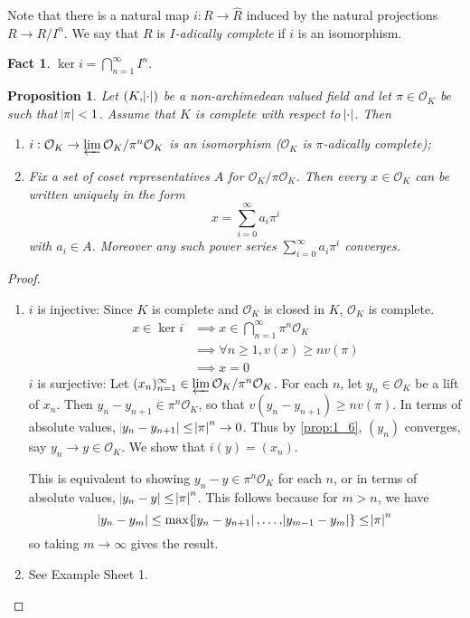 \documentclass[11pt]{article}
\theoremstyle{definition}
\newtheorem*{fact}{Fact}
\theoremstyle{plain}
\newtheorem{proposition}[definition]{Proposition}
\theoremstyle{remark}
\newcommand{\cO}{\mathcal{O}}
\begin{document}
Note that there is a natural map $i : R \to \widehat{R}$ induced by the natural projections $R \to R/I^n$. We say that $R$ is \emph{$I$-adically complete} if $i$ is an isomorphism.

\begin{fact}
    $\ker{i} = \bigcap_{n=1}^\infty I^n$.
\end{fact}

\begin{proposition}\label{prop:3_5}
    Let $(K, \abs{\cdot})$ be a non-archimedean valued field and let $\pi \in \cO_K$ be such that $\abs{\pi} < 1$. Assume that $K$ is complete with respect to $\abs{\cdot}$. Then
    \begin{enumerate}
        \item $i : \cO_K \to \varprojlim \cO_K / \pi^n \cO_K$ is an isomorphism ($\cO_K$ is $\pi$-adically complete);
        \item Fix a set of coset representatives $A$ for $\cO_K / \pi \cO_K$. Then every $x \in \cO_K$ can be written uniquely in the form
            \begin{equation*}
                x = \sum_{i=0}^\infty a_i \pi^i
            \end{equation*}
            with $a_i \in A$.
            Moreover any such power series $\sum_{i=0}^\infty a_i \pi^i$ converges.
    \end{enumerate}
\end{proposition}
\begin{proof}\phantom{}
    \begin{enumerate}
        \item $i$ is injective: Since $K$ is complete and $\cO_K$ is closed in $K$, $\cO_K$ is complete.
            \begin{align*}
                x \in \ker i
                &\implies x \in \bigcap_{n=1}^\infty \pi^n \cO_K\\
                &\implies \forall n \ge 1, v(x) \ge n v(\pi)\\
                &\implies x = 0
            \end{align*}
            $i$ is surjective: Let $(x_n)_{n=1}^\infty \in \varprojlim \cO_K / \pi^n \cO_K$. For each $n$, let $y_n \in \cO_K$ be a lift of $x_n$. Then $y_n - y_{n+1} \in \pi^n \cO_K$, so that $v(y_n - y_{n+1}) \ge n v(\pi)$. In terms of absolute values, $\abs{y_n - y_{n+1}} \le \abs{\pi}^n \to 0$. Thus by \autoref{prop:1_6}, $(y_n)$ converges, say $y_n \to y \in \cO_K$. We show that $i(y) = (x_n)$.

            This is equivalent to showing $y_n - y \in \pi^n \cO_K$ for each $n$, or in terms of absolute values, $\abs{y_n - y} \le \abs{\pi}^n$. This follows because for $m > n$, we have
            \begin{equation*}
                \abs{y_n - y_m} \le \max\{\abs{y_n - y_{n+1}}, \ldots, \abs{y_{m-1} - y_m} \} \le \abs{\pi}^n
            \end{equation*}
            so taking $m \to \infty$ gives the result.

        \item See Example Sheet 1. \qedhere
    \end{enumerate}
\end{proof}
\end{document}
